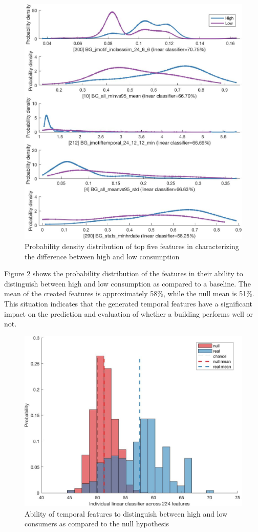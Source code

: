 \begin{figure}[ht!]
\begin{center}
\includegraphics[width=0.7\columnwidth]{figures/Output_HighvsLow_Features_1-5/Output_HighvsLow_Features_1-5}
\caption{{Probability density distribution of top five features in characterizing the difference between high and low consumption
\label{fig:topfivefeatures_highvslow}%
}}
\end{center}
\end{figure}

Figure \ref{sec:highvslow_nullhypth} shows the probability distribution of the features in their ability to distinguish between high and low consumption as compared to a baseline. The mean of the created features is approximately 58\%, while the null mean is 51\%. This situation indicates that the generated temporal features have a significant impact on the prediction and evaluation of whether a building performs well or not.

\begin{figure}[ht!]
\begin{center}
\includegraphics[width=0.7\columnwidth]{figures/Output_HighvsLow_Dist/Output_HighvsLow_Dist}
\caption{{Ability of temporal features to distinguish between high and low consumers as compared to the null hypothesis
\label{sec:highvslow_nullhypth}%
}}
\end{center}
\end{figure}

